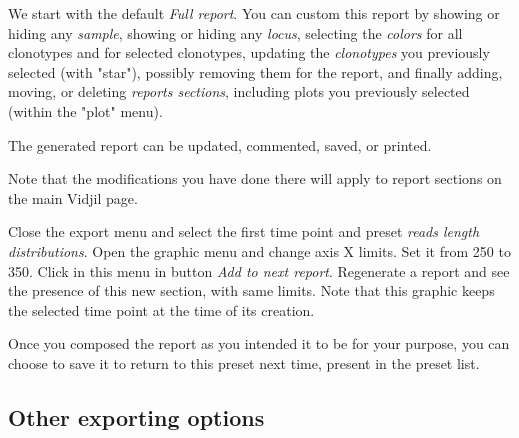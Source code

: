 
We start with the default \textit{Full report}.
You can custom this report by showing or hiding any \textit{sample},
showing or hiding any \textit{locus}, selecting the \textit{colors} for all clonotypes and for selected clonotypes,
updating the \textit{clonotypes} you previously selected (with "star"),  possibly removing them for the report,
and finally adding, moving, or deleting \textit{reports sections}, including plots you previously selected (within the "plot" menu).






The generated report can be updated, commented, saved, or printed.


Note that the modifications you have done there will apply to report sections on the main Vidjil page.


Close the export menu and select the first time point and preset \textit{reads length distributions}.
Open the graphic menu and change axis X limits. Set it from 250 to 350.
Click in this menu in button \textit{Add to next report}. 
Regenerate a report and see the presence of this new section, with same limits.
Note that this graphic keeps the selected time point at the time of its creation.

Once you composed the report as you intended it to be for your purpose, you can choose to save it to return to this preset next time, present in the preset list.

\subsection{Other exporting options}

